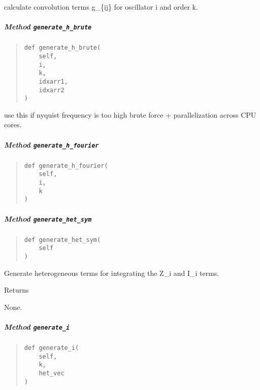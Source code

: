\documentclass[english,a4paper,oneside]{article}
\let\oldsubparagraph\subparagraph
\renewcommand{\subparagraph}[1]{\oldsubparagraph{#1}\mbox{}}
\begin{document}
calculate convolution terms g\_\{ij\} for oscillator i and order k.

\hypertarget{nBodyCoupling.nBodyCoupling.generate_h_brute}{%
\subparagraph{\texorpdfstring{Method
\texttt{generate\_h\_brute}}{Method generate\_h\_brute}}\label{nBodyCoupling.nBodyCoupling.generate_h_brute}}

\begin{quote}
\begin{verbatim}
def generate_h_brute(
    self,
    i,
    k,
    idxarr1,
    idxarr2
)
\end{verbatim}
\end{quote}

use this if nyquist frequency is too high brute force + parallelization
across CPU cores.

\hypertarget{nBodyCoupling.nBodyCoupling.generate_h_fourier}{%
\subparagraph{\texorpdfstring{Method
\texttt{generate\_h\_fourier}}{Method generate\_h\_fourier}}\label{nBodyCoupling.nBodyCoupling.generate_h_fourier}}

\begin{quote}
\begin{verbatim}
def generate_h_fourier(
    self,
    i,
    k
)
\end{verbatim}
\end{quote}

\hypertarget{nBodyCoupling.nBodyCoupling.generate_het_sym}{%
\subparagraph{\texorpdfstring{Method
\texttt{generate\_het\_sym}}{Method generate\_het\_sym}}\label{nBodyCoupling.nBodyCoupling.generate_het_sym}}

\begin{quote}
\begin{verbatim}
def generate_het_sym(
    self
)
\end{verbatim}
\end{quote}

Generate heterogeneous terms for integrating the Z\_i and I\_i terms.

Returns

None.

\hypertarget{nBodyCoupling.nBodyCoupling.generate_i}{%
\subparagraph{\texorpdfstring{Method
\texttt{generate\_i}}{Method generate\_i}}\label{nBodyCoupling.nBodyCoupling.generate_i}}

\begin{quote}
\begin{verbatim}
def generate_i(
    self,
    k,
    het_vec
)
\end{verbatim}
\end{quote}
\end{document}
